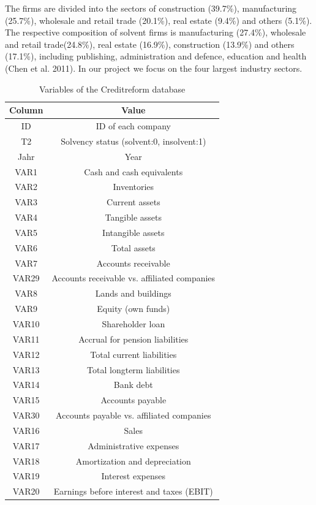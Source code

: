 \documentclass{article}
\begin{document}
The firms are divided into the sectors of construction (39.7\%), manufacturing (25.7\%), wholesale and retail trade (20.1\%), real estate (9.4\%) and others (5.1\%). The respective composition of solvent firms is manufacturing (27.4\%), wholesale and retail trade(24.8\%), real estate (16.9\%), construction (13.9\%) and others (17.1\%), including publishing, administration and defence, education and health (Chen et al. 2011). In our project we focus on the four largest industry sectors.

\begin{center}
\begin{table}
\centering
\caption{Variables of the Creditreform database}
\label{creditVars}
\begin{tabular}{cc} 
\hline\hline
Column & Value\\
\hline
ID & ID of each company\\
T2 & Solvency status (solvent:0, insolvent:1)\\
Jahr & Year\\
VAR1 & Cash and cash equivalents\\
VAR2 & Inventories\\
VAR3 & Current assets\\
VAR4 & Tangible assets\\
VAR5 & Intangible assets\\
VAR6 & Total assets\\
VAR7 & Accounts receivable\\
VAR29 & Accounts receivable vs. affiliated companies\\
VAR8 & Lands and buildings\\
VAR9 & Equity (own funds)\\
VAR10 & Shareholder loan\\
VAR11 & Accrual for pension liabilities\\
VAR12 & Total current liabilities\\
VAR13 & Total longterm liabilities\\
VAR14 & Bank debt\\
VAR15 & Accounts payable\\
VAR30 & Accounts payable vs. affiliated companies\\
VAR16 & Sales\\
VAR17 & Administrative expenses\\
VAR18 & Amortization and depreciation\\
VAR19 & Interest expenses\\
VAR20 & Earnings before interest and taxes (EBIT)\\

\end{tabular}
\end{table}
\end{center}
\end{document}
